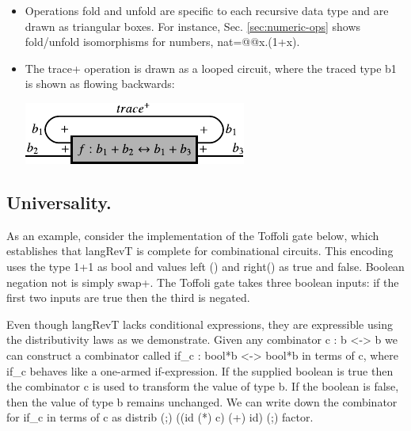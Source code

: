 \documentclass{llncs}
\begin{document}
\begin{itemize}
\item Operations {{fold}} and {{unfold}} are specific to each recursive
  data type and are drawn as triangular boxes. For instance,
  Sec. \ref{sec:numeric-ops} shows {{fold}}/{{unfold}} isomorphisms for
  numbers, {{nat=@@x.(1+x)}}.

\item The {{trace+}} operation is drawn as a looped circuit, where the
  traced type {{b1}} is shown as flowing backwards:

\begin{center}
  \includegraphics{diagrams/thesis/trace_plus.pdf}
\end{center}

\end{itemize}

\subsection{Universality.} 
As an example, consider the implementation of the Toffoli gate below,
which establishes that {{langRevT}} is complete for combinational
circuits. This encoding uses the type {{1+1}} as {{bool}} and values
{{left ()}} and {{right()}} as {{true}} and {{false}}.  Boolean
negation not is simply {{swap+}}. The Toffoli gate takes three boolean
inputs: if the first two inputs are {{true}} then the third is
negated. 

Even though {{langRevT}} lacks conditional expressions, they are
expressible using the distributivity laws as we demonstrate.  Given
any combinator {{c : b <-> b}} we can construct a combinator called
{{if_c : bool*b <-> bool*b}} in terms of {{c}}, where {{if_c}}
behaves like a one-armed if-expression. If the supplied boolean is
true then the combinator {{c}} is used to transform the value of type
{{b}}. If the boolean is {{false}}, then the value of type {{b}}
remains unchanged. We can write down the combinator for {{if_c}} in
terms of {{c}} as {{distrib (;) ((id (*) c) (+) id) (;) factor}}.
\end{document}
